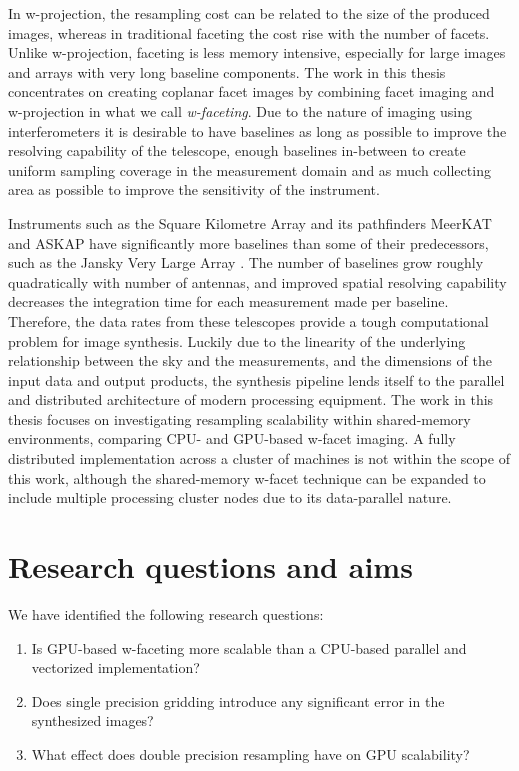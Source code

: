 In w-projection, the resampling cost can be related to the size of the produced images, whereas in traditional faceting the cost rise with the number of facets. Unlike w-projection, faceting 
is less memory intensive, especially for large images and arrays with very long baseline components. The work in this thesis concentrates on creating coplanar facet images by combining facet 
imaging and w-projection in what we call \textit{w-faceting}. Due to the nature of imaging using interferometers it is desirable to have baselines as long as possible to improve the resolving
capability of the telescope, enough baselines in-between to create uniform sampling coverage in the measurement domain and as much collecting area as possible to improve the sensitivity of 
the instrument. 

Instruments such as the Square Kilometre Array \cite{carilli2004science} and its pathfinders MeerKAT \cite{booth2009meerkat} and ASKAP \cite{johnston2008science} have significantly more
baselines than some of their predecessors, such as the Jansky Very Large Array \cite{2041-8205-739-1-L1}. The number of baselines grow roughly quadratically with number of antennas, and improved spatial resolving 
capability decreases the integration time for each measurement made per baseline. Therefore, the data rates from these telescopes provide a tough computational problem for image synthesis. Luckily due to
the linearity of the underlying relationship between the sky and the measurements, and the dimensions of the input data and output products, the synthesis pipeline lends itself to the parallel and 
distributed architecture of modern processing equipment. The work in this thesis focuses on investigating resampling scalability within shared-memory environments, comparing CPU- and GPU-based w-facet imaging.
A fully distributed implementation across a cluster of machines is not within the scope of this work, although the shared-memory w-facet technique can be expanded to include multiple processing cluster nodes due to its data-parallel 
nature.
\section{Research questions and aims}
We have identified the following research questions:
\begin{enumerate}
 \item Is GPU-based w-faceting more scalable than a CPU-based parallel and vectorized implementation?
 \item Does single precision gridding introduce any significant error in the synthesized images?
 \item What effect does double precision resampling have on GPU scalability?
\end{enumerate}

